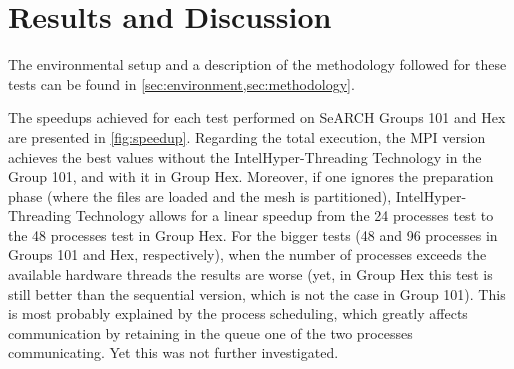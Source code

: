 \section{Results and Discussion}
\label{sec:results}

The environmental setup and a description of the methodology followed for these tests can be found in \cref{sec:environment,sec:methodology}.

The speedups achieved for each test performed on SeARCH Groups 101 and Hex are presented in \cref{fig:speedup}. Regarding the total execution, the MPI version achieves the best values without the Intel\textregistered Hyper-Threading Technology in the Group 101, and with it in Group Hex. Moreover, if one ignores the preparation phase (where the files are loaded and the mesh is partitioned), Intel\textregistered Hyper-Threading Technology allows for a linear speedup from the 24 processes test to the 48 processes test in Group Hex. For the bigger tests (48 and 96 processes in Groups 101 and Hex, respectively), when the number of processes exceeds the available hardware threads the results are worse (yet, in Group Hex this test is still better than the sequential version, which is not the case in Group 101). This is most probably explained by the process scheduling, which greatly affects communication by retaining in the queue one of the two processes communicating. Yet this was not further investigated.

